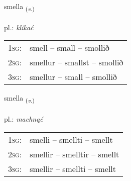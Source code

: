\documentclass[frontgrid, backgrid]{flacards}\usepackage[]{graphicx}\usepackage[]{xcolor}
\begin{document}
\renewcommand{\flhead}{\vskip5pt \fboxsep=0pt {\small\bfseries\footnotesize Sagnorð | czasownik}}
\renewcommand{\fcfoot}{\vskip5pt \fboxsep=0pt \hspace{2pt}{\small\bfseries\footnotesize 3K}}

\renewcommand{\blhead}{\vskip5pt {\small\bfseries\footnotesize Sagnorð | czasownik }}
\renewcommand{\bcfoot}{\vskip5pt \hspace{2pt}{\small\bfseries\footnotesize 3K}}


{smella \small{\textsubscript{(\textit{v.})}} \\[1ex] %
\textphonetic{[smɛtla]} \\
pl.: \emph{klikać} \\  [2ex]
\renewcommand*{\arraystretch}{0.8}
\begin{tabular}{p{1cm}l}
\textsc{1sg}: & smell -- small -- smollið \\ 
\textsc{2sg}: & smellur -- smallst -- smollið \\ 
\textsc{3sg}: & smellur -- small -- smollið \\ 
\end{tabular}
}

\renewcommand{\flhead}{\vskip5pt \fboxsep=0pt {\small\bfseries\footnotesize Sagnorð | czasownik}}
\renewcommand{\fcfoot}{\vskip5pt \fboxsep=0pt \hspace{2pt}{\small\bfseries\footnotesize 3K}}

\renewcommand{\blhead}{\vskip5pt {\small\bfseries\footnotesize Sagnorð | czasownik }}
\renewcommand{\bcfoot}{\vskip5pt \hspace{2pt}{\small\bfseries\footnotesize 3K}}


{smella \small{\textsubscript{(\textit{v.})}} \\[1ex] %
\textphonetic{[smɛtla]} \\
pl.: \emph{machnąć} \\  [2ex]
\renewcommand*{\arraystretch}{0.8}
\begin{tabular}{p{1cm}l}
\textsc{1sg}: & smelli -- smellti -- smellt \\ 
\textsc{2sg}: & smellir -- smelltir -- smellt \\ 
\textsc{3sg}: & smellir -- smellti -- smellt \\ 
\end{tabular}
}
\end{document}
